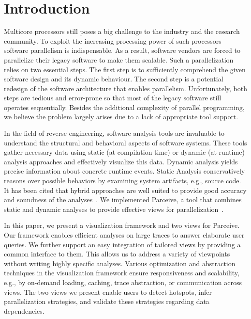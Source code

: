\section{Introduction}
\label{sec:introduction}
Multicore processors still poses a big challenge to the industry and the
research community. To exploit the increasing processing power of such
processors software parallelism is indispensable. As a result, software vendors
are forced to parallelize their legacy software to make them scalable. Such a
parallelization relies on two essential steps. The first step is to
sufficiently comprehend the given software design and its dynamic behaviour.
The second step is a potential redesign of the software architecture that
enables parallelism. Unfortunately, both steps are tedious and error-prone so
that most of the legacy software still operates sequentially. Besides the
additional complexity of parallel programming, we believe the problem largely
arises due to a lack of appropriate tool support.

In the field of reverse engineering, software analysis tools are invaluable to
understand the structural and behavioral aspects of software systems. These
tools gather necessary data using static (at compilation time) or dynamic
(at runtime) analysis approaches and effectively visualize this data. Dynamic
analysis yields precise information about concrete runtime events. Static
Analysis conservatively reasons over possible behaviors by examining system
artifacts, e.g., source code. It has been cited that hybrid approaches are well
suited to provide good accuracy and soundness of the
analyses~\cite{StaticDynamic}. We implemented Parceive, a tool that combines
static and dynamic analyses to provide effective views for
parallelization~\cite{Parceive}.

In this paper, we present a visualization framework and two views for Parceive.
Our framework enables efficient analyses on large traces to answer elaborate
user queries. We further support an easy integration of tailored views by
providing a common interface to them. This allows us to address a variety of
viewpoints without writing highly specific analyses. Various optimization and
abstraction techniques in the visualization framework ensure responsiveness and
scalability, e.g., by on-demand loading, caching, trace abstraction, or
communication across views. The two views we present enable users to detect
hotspots, infer parallelization strategies, and validate these strategies
regarding data dependencies.
